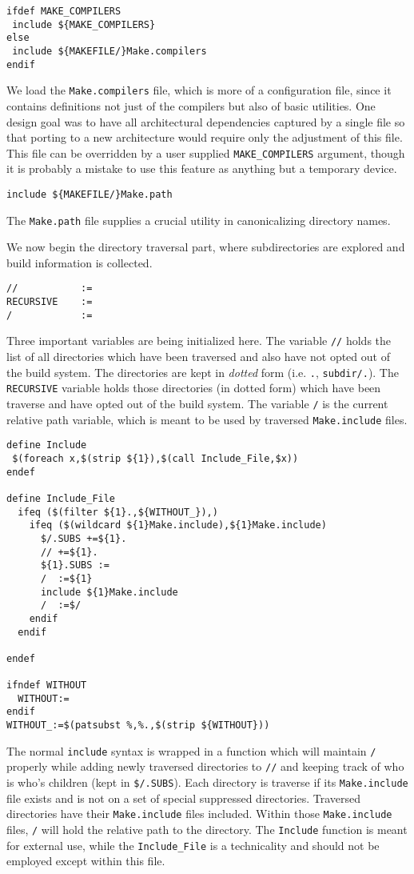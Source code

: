 \documentclass{article}
\begin{document}
\begin{verbatim}
ifdef MAKE_COMPILERS
 include ${MAKE_COMPILERS}
else
 include ${MAKEFILE/}Make.compilers
endif
\end{verbatim}
We load the \verb+Make.compilers+ file, which is more of a
configuration file, since it contains definitions not just of the
compilers but also of basic utilities.  One design goal was to have
all architectural dependencies captured by a single file so
that porting to a new architecture would require only the adjustment
of this file.  This file can be overridden by a user supplied
\verb+MAKE_COMPILERS+ argument, though it is probably a mistake
to use this feature as anything but a temporary device.

\begin{verbatim}
include ${MAKEFILE/}Make.path
\end{verbatim}
The \verb+Make.path+ file supplies a crucial utility in canonicalizing
directory names.

We now begin the directory traversal part, where subdirectories are
explored and build information is collected.

\begin{verbatim}
//           :=
RECURSIVE    :=
/            :=
\end{verbatim}
Three important variables are being initialized here.  The variable
\verb+//+ holds the list of all directories which have been traversed
and also have not opted out of the build system.  The directories are
kept in {\em dotted} form (i.e. \verb+.+, \verb+subdir/.+).  The
\verb+RECURSIVE+ variable holds those directories (in dotted form)
which have been traverse and have opted out of the build system.  The
variable \verb+/+ is the current relative path variable, which is
meant to be used by traversed \verb+Make.include+ files.


\begin{verbatim}
define Include
 $(foreach x,$(strip ${1}),$(call Include_File,$x))
endef

define Include_File
  ifeq ($(filter ${1}.,${WITHOUT_}),)
    ifeq ($(wildcard ${1}Make.include),${1}Make.include)
      $/.SUBS +=${1}.
      // +=${1}.
      ${1}.SUBS :=
      /  :=${1}
      include ${1}Make.include
      /  :=$/
    endif
  endif

endef

ifndef WITHOUT
  WITHOUT:=
endif
WITHOUT_:=$(patsubst %,%.,$(strip ${WITHOUT}))
\end{verbatim}
The normal \verb+include+ syntax is wrapped in a function which will
maintain \verb+/+ properly while adding newly traversed directories to
\verb+//+ and keeping track of who is who's children (kept in
\verb+$/.SUBS+).  Each directory
is traverse if its \verb+Make.include+ file exists and is not on
a set of special suppressed directories.  Traversed directories
have their \verb+Make.include+ files included.  Within those
\verb+Make.include+ files, \verb+/+ will hold the relative path
to the directory.  The \verb+Include+ function is meant for external
use, while the \verb+Include_File+ is a technicality and should not
be employed except within this file.
\end{document}
